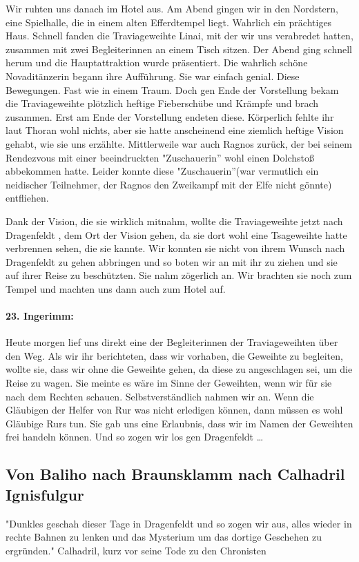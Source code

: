 Wir ruhten uns danach im Hotel aus. Am Abend gingen wir in den Nordstern, eine Spielhalle, die in einem alten Efferdtempel liegt. Wahrlich ein prächtiges Haus. Schnell fanden die Traviageweihte Linai, mit der wir uns verabredet hatten, zusammen mit zwei Begleiterinnen an einem Tisch sitzen. Der Abend ging schnell herum und die Hauptattraktion wurde präsentiert. Die wahrlich schöne Novaditänzerin begann ihre Aufführung. Sie war einfach genial. Diese Bewegungen. Fast wie in einem Traum. Doch gen Ende der Vorstellung bekam die Traviageweihte plötzlich heftige Fieberschübe und Krämpfe und brach zusammen. Erst am Ende der Vorstellung endeten diese. Körperlich fehlte ihr laut Thoran wohl nichts, aber sie hatte anscheinend eine ziemlich heftige Vision gehabt, wie sie uns erzählte. Mittlerweile war auch Ragnos zurück, der bei seinem Rendezvous mit einer beeindruckten "Zuschauerin'' wohl einen Dolchstoß abbekommen hatte. Leider konnte diese "Zuschauerin''(war vermutlich ein neidischer Teilnehmer, der Ragnos den Zweikampf mit der Elfe nicht gönnte) entfliehen. \par

Dank der Vision, die sie wirklich mitnahm, wollte die Traviageweihte jetzt nach Dragenfeldt , dem Ort der Vision gehen, da sie dort wohl eine Tsageweihte hatte verbrennen sehen, die sie kannte. Wir konnten sie nicht von ihrem Wunsch nach Dragenfeldt zu gehen abbringen und so boten wir an mit ihr zu ziehen und sie auf ihrer Reise zu beschützten. Sie nahm zögerlich an. Wir brachten sie noch zum Tempel und machten uns dann auch zum Hotel auf.

\paragraph{23. Ingerimm:}
Heute morgen lief uns direkt eine der Begleiterinnen der Traviageweihten über den Weg. Als wir ihr berichteten, dass wir vorhaben, die Geweihte zu begleiten, wollte sie, dass wir ohne die Geweihte gehen, da diese zu angeschlagen sei, um die Reise zu wagen. Sie meinte es wäre im Sinne der Geweihten, wenn wir für sie nach dem Rechten schauen. Selbstverständlich nahmen wir an. Wenn die Gläubigen der Helfer von Rur was nicht erledigen können, dann müssen es wohl Gläubige Rurs tun. Sie gab uns eine Erlaubnis, dass wir im Namen der Geweihten frei handeln können. Und so zogen wir los gen Dragenfeldt \dots


\subsection{Von Baliho nach Braunsklamm nach Calhadril Ignisfulgur}
"Dunkles geschah dieser Tage in Dragenfeldt  und so zogen wir aus, alles wieder in rechte Bahnen zu lenken und das Mysterium um das dortige Geschehen zu ergründen." 
Calhadril, kurz vor seine Tode zu den Chronisten

